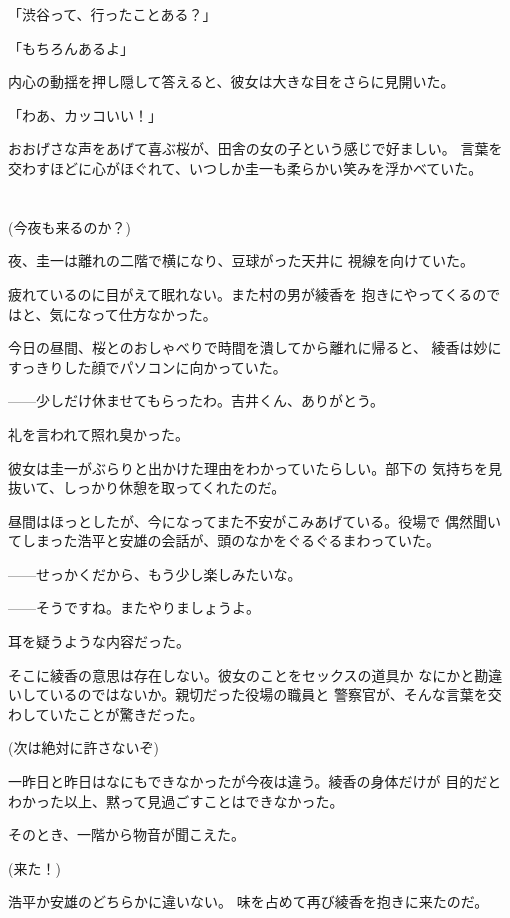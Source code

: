 ﻿\documentclass[
    book,tate,
    line_length=30zw,
    jafontsize=12pt,
    paper=b5j,
    landscape,
    ]{jlreq}
\begin{document}
「渋谷って、行ったことある？」

「もちろんあるよ」

内心の動揺を押し隠して答えると、彼女は大きな目をさらに見開いた。

「わあ、カッコいい！」

おおげさな声をあげて喜ぶ桜が、田舎の女の子という感じで好ましい。
言葉を交わすほどに心がほぐれて、いつしか圭一も柔らかい笑みを浮かべていた。

\section*{}

(今夜も来るのか？)

夜、圭一は離れの二階で横になり、豆球がった天井に
視線を向けていた。

疲れているのに目がえて眠れない。また村の男が綾香を
抱きにやってくるのではと、気になって仕方なかった。

今日の昼間、桜とのおしゃべりで時間を潰してから離れに帰ると、
綾香は妙にすっきりした顔でパソコンに向かっていた。

------少しだけ休ませてもらったわ。吉井くん、ありがとう。

礼を言われて照れ臭かった。

彼女は圭一がぶらりと出かけた理由をわかっていたらしい。部下の
気持ちを見抜いて、しっかり休憩を取ってくれたのだ。

昼間はほっとしたが、今になってまた不安がこみあげている。役場で
偶然聞いてしまった浩平と安雄の会話が、頭のなかをぐるぐるまわっていた。

------せっかくだから、もう少し楽しみたいな。

------そうですね。またやりましょうよ。

耳を疑うような内容だった。

そこに綾香の意思は存在しない。彼女のことをセックスの道具か
なにかと勘違いしているのではないか。親切だった役場の職員と
警察官が、そんな言葉を交わしていたことが驚きだった。

(次は絶対に許さないぞ)

一昨日と昨日はなにもできなかったが今夜は違う。綾香の身体だけが
目的だとわかった以上、黙って見過ごすことはできなかった。

そのとき、一階から物音が聞こえた。

(来た！)

浩平か安雄のどちらかに違いない。 味を占めて再び綾香を抱きに来たのだ。
\end{document}
